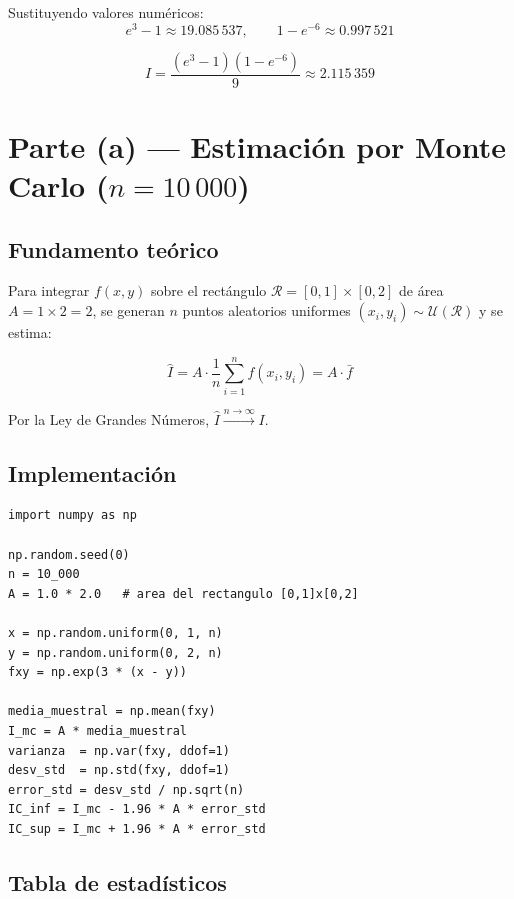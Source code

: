 \documentclass[12pt,a4paper]{article}
\begin{document}
Sustituyendo valores num\'ericos:
\[
  e^3 - 1 \approx 19.085\,537, \qquad
  1 - e^{-6} \approx 0.997\,521
\]

\[
  \boxed{I = \frac{(e^3-1)(1-e^{-6})}{9} \approx 2.115\,359}
\]

\section*{Parte (a) --- Estimaci\'on por Monte Carlo ($n=10\,000$)}

\subsection*{Fundamento te\'orico}

Para integrar $f(x,y)$ sobre el rect\'angulo $\mathcal{R} = [0,1]\times[0,2]$
de \'area $A = 1\times 2 = 2$, se generan $n$ puntos aleatorios uniformes
$(x_i, y_i)\sim\mathcal{U}(\mathcal{R})$ y se estima:

\[
  \hat{I} = A\cdot\frac{1}{n}\sum_{i=1}^{n} f(x_i, y_i)
           = A\cdot\bar{f}
\]

Por la Ley de Grandes N\'umeros, $\hat{I}\xrightarrow{n\to\infty} I$.

\subsection*{Implementaci\'on}

\begin{lstlisting}[caption={Monte Carlo con n = 10 000 (\texttt{seed=0})}]
import numpy as np

np.random.seed(0)
n = 10_000
A = 1.0 * 2.0   # area del rectangulo [0,1]x[0,2]

x = np.random.uniform(0, 1, n)
y = np.random.uniform(0, 2, n)
fxy = np.exp(3 * (x - y))

media_muestral = np.mean(fxy)
I_mc = A * media_muestral
varianza  = np.var(fxy, ddof=1)
desv_std  = np.std(fxy, ddof=1)
error_std = desv_std / np.sqrt(n)
IC_inf = I_mc - 1.96 * A * error_std
IC_sup = I_mc + 1.96 * A * error_std
\end{lstlisting}

\subsection*{Tabla de estad\'isticos}
\end{document}
